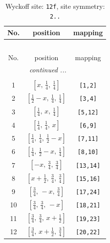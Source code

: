 \documentclass[fleqn,8pt]{jsarticle}
\begin{document}
\begin{longtable}{ccc}
\caption{Wyckoff site: {\tt 12f}, site symmetry: {\tt 2..}}
 \\
 \hline \hline
No. & position & mapping \\ \hline \endfirsthead

\multicolumn{2}{l}{\tablename\ \thetable{}} \\
 \hline \hline
No. & position & mapping \\ \hline \endhead

 \hline \hline
\multicolumn{2}{r}{\footnotesize\it continued ...} \\ \endfoot

 \hline \hline
\multicolumn{2}{r}{} \\ \endlastfoot

1 & $\left[ x,\, \frac{1}{4},\, \frac{1}{4} \right]$ & {\tt [1,2]} \\ \hline
2 & $\left[ \frac{1}{2} - x,\, \frac{1}{4},\, \frac{1}{4} \right]$ & {\tt [3,4]} \\ \hline
3 & $\left[ \frac{1}{4},\, x,\, \frac{1}{4} \right]$ & {\tt [5,12]} \\ \hline
4 & $\left[ \frac{1}{4},\, \frac{1}{4},\, x \right]$ & {\tt [6,9]} \\ \hline
5 & $\left[ \frac{1}{4},\, \frac{1}{4},\, \frac{1}{2} - x \right]$ & {\tt [7,11]} \\ \hline
6 & $\left[ \frac{1}{4},\, \frac{1}{2} - x,\, \frac{1}{4} \right]$ & {\tt [8,10]} \\ \hline
7 & $\left[ - x,\, \frac{3}{4},\, \frac{3}{4} \right]$ & {\tt [13,14]} \\ \hline
8 & $\left[ x + \frac{1}{2},\, \frac{3}{4},\, \frac{3}{4} \right]$ & {\tt [15,16]} \\ \hline
9 & $\left[ \frac{3}{4},\, - x,\, \frac{3}{4} \right]$ & {\tt [17,24]} \\ \hline
10 & $\left[ \frac{3}{4},\, \frac{3}{4},\, - x \right]$ & {\tt [18,21]} \\ \hline
11 & $\left[ \frac{3}{4},\, \frac{3}{4},\, x + \frac{1}{2} \right]$ & {\tt [19,23]} \\ \hline
12 & $\left[ \frac{3}{4},\, x + \frac{1}{2},\, \frac{3}{4} \right]$ & {\tt [20,22]} \\
\end{longtable}
\renewcommand{\arraystretch}{1.2}
\end{document}
